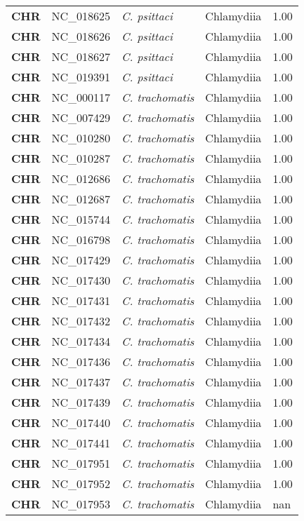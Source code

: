 \begin{adjustwidth}{-3cm}{2cm}
{\begin{supertabular}{>{\bfseries}l|p{0.1\textwidth}p{0.14\textwidth}l|l}
CHR & NC\_018625 & \textit{C. psittaci} & Chlamydiia & 1.00\\
CHR & NC\_018626 & \textit{C. psittaci} & Chlamydiia & 1.00\\
CHR & NC\_018627 & \textit{C. psittaci} & Chlamydiia & 1.00\\
CHR & NC\_019391 & \textit{C. psittaci} & Chlamydiia & 1.00\\
CHR & NC\_000117 & \textit{C. trachomatis} & Chlamydiia & 1.00\\
CHR & NC\_007429 & \textit{C. trachomatis} & Chlamydiia & 1.00\\
CHR & NC\_010280 & \textit{C. trachomatis} & Chlamydiia & 1.00\\
CHR & NC\_010287 & \textit{C. trachomatis} & Chlamydiia & 1.00\\
CHR & NC\_012686 & \textit{C. trachomatis} & Chlamydiia & 1.00\\
CHR & NC\_012687 & \textit{C. trachomatis} & Chlamydiia & 1.00\\
CHR & NC\_015744 & \textit{C. trachomatis} & Chlamydiia & 1.00\\
CHR & NC\_016798 & \textit{C. trachomatis} & Chlamydiia & 1.00\\
CHR & NC\_017429 & \textit{C. trachomatis} & Chlamydiia & 1.00\\
CHR & NC\_017430 & \textit{C. trachomatis} & Chlamydiia & 1.00\\
CHR & NC\_017431 & \textit{C. trachomatis} & Chlamydiia & 1.00\\
CHR & NC\_017432 & \textit{C. trachomatis} & Chlamydiia & 1.00\\
CHR & NC\_017434 & \textit{C. trachomatis} & Chlamydiia & 1.00\\
CHR & NC\_017436 & \textit{C. trachomatis} & Chlamydiia & 1.00\\
CHR & NC\_017437 & \textit{C. trachomatis} & Chlamydiia & 1.00\\
CHR & NC\_017439 & \textit{C. trachomatis} & Chlamydiia & 1.00\\
CHR & NC\_017440 & \textit{C. trachomatis} & Chlamydiia & 1.00\\
CHR & NC\_017441 & \textit{C. trachomatis} & Chlamydiia & 1.00\\
CHR & NC\_017951 & \textit{C. trachomatis} & Chlamydiia & 1.00\\
CHR & NC\_017952 & \textit{C. trachomatis} & Chlamydiia & 1.00\\
CHR & NC\_017953 & \textit{C. trachomatis} & Chlamydiia & nan\\

\end{supertabular}}
\end{adjustwidth}
